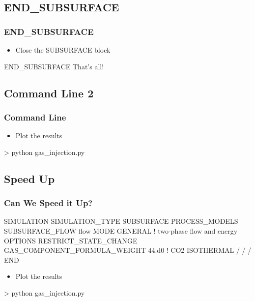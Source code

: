 \documentclass{beamer}
\newcommand\bluecomment[1]{{{\color{blue} #1}}}
\begin{document}
\subsection{END\_SUBSURFACE}
\begin{frame}[fragile]\frametitle{END\_SUBSURFACE}
\begin{itemize}
  \item Close the SUBSURFACE block
\end{itemize}

\begin{semiverbatim}
END_SUBSURFACE \bluecomment{That's all!}
\end{semiverbatim}
\end{frame}

\subsection{Command Line 2}
\begin{frame}[fragile]\frametitle{Command Line}

\begin{itemize}
  \item Plot the results
\end{itemize}

\begin{semiverbatim}
> python gas_injection.py
\end{semiverbatim}

\end{frame}

\subsection{Speed Up}
\begin{frame}[fragile]\frametitle{Can We Speed it Up?}

\begin{semiverbatim}
SIMULATION
  SIMULATION_TYPE SUBSURFACE
  PROCESS_MODELS
    SUBSURFACE_FLOW flow
      MODE GENERAL ! two-phase flow and energy
      OPTIONS
        RESTRICT_STATE_CHANGE
        GAS_COMPONENT_FORMULA_WEIGHT 44.d0 ! CO2
        ISOTHERMAL 
      /
    /
  /
END
\end{semiverbatim}

\begin{itemize}
  \item Plot the results
\end{itemize}

\begin{semiverbatim}
> python gas_injection.py
\end{semiverbatim}

\end{frame}
\end{document}
